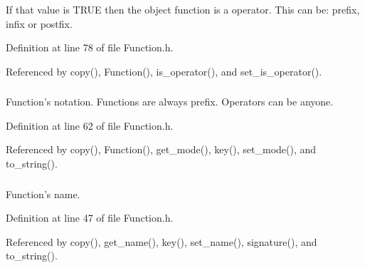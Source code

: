 If that value is TRUE then the object function is a operator. This can be: prefix, infix or postfix. 



Definition at line 78 of file Function.h.



Referenced by copy(), Function(), is\_\-operator(), and set\_\-is\_\-operator().

\hypertarget{classgenevalmag_1_1Function_a63645db8078f5c96b2c24d4873ee0fcd}{
\subsubsection[{f\_\-mod}]{}}
\label{classgenevalmag_1_1Function_a63645db8078f5c96b2c24d4873ee0fcd}


Function's notation. Functions are always prefix. Operators can be anyone. 



Definition at line 62 of file Function.h.



Referenced by copy(), Function(), get\_\-mode(), key(), set\_\-mode(), and to\_\-string().

\hypertarget{classgenevalmag_1_1Function_adab115bdcdc014b30b2b9c9e2da07109}{
\subsubsection[{f\_\-name}]{}}
\label{classgenevalmag_1_1Function_adab115bdcdc014b30b2b9c9e2da07109}


Function's name. 



Definition at line 47 of file Function.h.



Referenced by copy(), get\_\-name(), key(), set\_\-name(), signature(), and to\_\-string().

\hypertarget{classgenevalmag_1_1Function_a24cd8c438fe7af6c23d91a83587acce9}{
\subsubsection[{f\_\-prec}]{}}
\label{classgenevalmag_1_1Function_a24cd8c438fe7af6c23d91a83587acce9}


